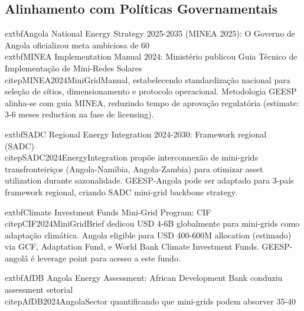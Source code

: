 \documentclass[12pt, a4paper]{article}
\begin{document}
{{{{{{{{{{{{\subsection{Alinhamento com Políticas Governamentais}

	extbf{Angola National Energy Strategy 2025-2035 (MINEA 2025)}: O Governo de Angola oficializou meta ambiciosa de 60\\%

	extbf{MINEA Implementation Manual 2024}: Ministério publicou Guia Técnico de Implementação de Mini-Redes Solares~\\citep{MINEA2024MiniGridManual}, estabelecendo standardização nacional para seleção de sítios, dimensionamento e protocolo operacional. Metodologia GEESP alinha-se com guia MINEA, reduzindo tempo de aprovação regulatória (estimate: 3-6 meses reduction na fase de licensing).

	extbf{SADC Regional Energy Integration 2024-2030}: Framework regional (SADC)~\\citep{SADC2024EnergyIntegration} propõe interconnexão de mini-grids transfronteiriços (Angola-Namibia, Angola-Zambia) para otimizar asset utilization durante sazonalidade. GEESP-Angola pode ser adaptado para 3-país framework regional, criando SADC mini-grid backbone strategy.

	extbf{Climate Investment Funds Mini-Grid Program}: CIF~\\citep{CIF2024MiniGridBrief} dedicou USD 4-6B globalmente para mini-grids como adaptação climática. Angola eligible para USD 400-600M allocation (estimado) via GCF, Adaptation Fund, e World Bank Climate Investment Funds. GEESP-angolâ é leverage point para acesso a este fundo.

	extbf{AfDB Angola Energy Assessment}: African Development Bank conduziu assessment setorial~\\citep{AfDB2024AngolaSector} quantificando que mini-grids podem absorver 35-40\\%

}}}}}}}}}}}}
\end{document}
